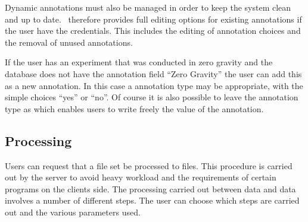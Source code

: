 Dynamic annotations must also be managed in order to keep the system clean and up to date. \appName\ therefore provides full editing options for existing annotations if the user have the credentials. This includes the editing of  annotation choices and the removal of unused annotations.

\begin{example}
If the user has an experiment that was conducted in zero gravity and the database does not have the annotation field ``Zero Gravity'' the user can add this as a new annotation. In this case a  annotation type may be appropriate, with the simple choices ``yes'' or ``no''. Of course it is also possible to leave the annotation type as  which enables users to write  freely the value of the annotation.
\end{example}

\subsection{Processing}
Users can request that a  file set be processed to  files. This procedure is carried out by the server to avoid heavy workload and the requirements of certain programs on the clients side. The processing carried out between  data and  data involves a number of different steps. The user can choose which steps are carried out and the various parameters used.
